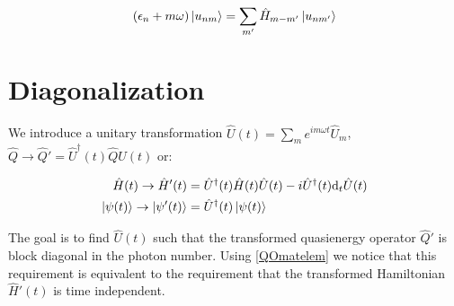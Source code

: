 \begin{equation}
(\epsilon_n+m\omega)\ket{u_{nm}} = \sum_{m'}\hat{H}_{m-m'}\ket{u_{nm'}}
\end{equation}

\section{Diagonalization}

We introduce a unitary transformation $\hat{U}(t)=\sum_m e^{im\omega t}\hat{U}_m$, $\hat{Q} \rightarrow \hat{Q}'=\hat{U}^{\dagger}(t)\hat{Q}\hat{U}(t)$ or:

\begin{align}
\hat{H}(t) \rightarrow \hat{H}'(t) &= \hat{U}^{\dagger}(t)\hat{H}(t)\hat{U}(t) - i\hat{U}^{\dagger}(t)\text{d}_t\hat{U}(t) \\
\ket{\psi(t)} \rightarrow \ket{\psi'(t)} &= \hat{U}^{\dagger}(t)\ket{\psi(t)}
\end{align}

The goal is to find $\hat{U}(t)$ such that the transformed quasienergy operator $\hat{Q}'$ is block diagonal in the photon number. Using \ref{QOmatelem} we notice that this requirement is equivalent to the requirement that the transformed Hamiltonian $\hat{H}'(t)$ is time independent.

















